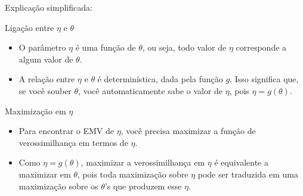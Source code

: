 \documentclass[12pt]{beamer}
\begin{document}
\begin{frame}{Explicação simplificada:}
	\begin{block}{Ligação entre \( \eta \) e \( \theta \)}
		\begin{itemize}
			\justifying
			\item O parâmetro \( \eta \) é uma função de \( \theta \), ou seja, todo valor de \( \eta \) corresponde a algum valor de \( \theta \).
			\item A relação entre \( \eta \) e \( \theta \) é determinística, dada pela função \( g \). Isso significa que, se você souber \( \theta \), você automaticamente sabe o valor de \( \eta \), pois \( \eta = g(\theta) \).
			
		\end{itemize}
	\end{block}
	\pause
	\begin{block}{Maximização em \( \eta \)}
		\begin{itemize}
			\justifying
			\item Para encontrar o EMV de \( \eta \), você precisa maximizar a função de verossimilhança em termos de \( \eta \).
			\item Como \( \eta = g(\theta) \), maximizar a verossimilhança em \( \eta \) é equivalente a maximizar em \( \theta \), pois toda maximização sobre \( \eta \) pode ser traduzida em uma maximização sobre os \( \theta \)'s que produzem esse \( \eta \).
		\end{itemize}
	\end{block}
\end{frame}
\end{document}
